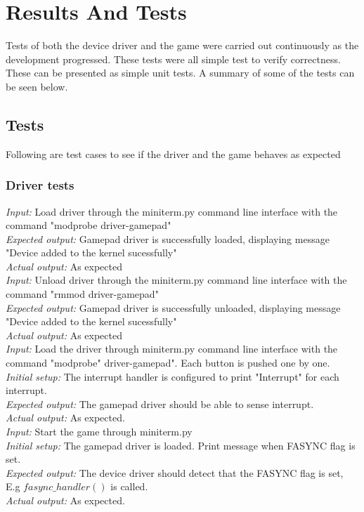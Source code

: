 \section{Results And Tests}
Tests of both the device driver and the game were carried out continuously as the development progressed. These tests were all simple test to verify correctness. These can be presented as simple unit tests. A summary of some of the tests can be seen below.  

\subsection{Tests}

Following are test cases to see if the driver and the game behaves as expected

\subsubsection{Driver tests}

\emph{Input: } Load driver through the miniterm.py command line interface with the command "modprobe driver-gamepad"\\
\emph{Expected output: } Gamepad driver is successfully loaded, displaying message "Device added to the kernel sucessfully"\\
\emph{Actual output: } As expected\\

\emph{Input: } Unload driver through the miniterm.py command line interface with the command "rmmod driver-gamepad"\\
\emph{Expected output: } Gamepad driver is successfully unloaded, displaying message "Device added to the kernel sucessfully"\\
\emph{Actual output: } As expected\\

\emph{Input: } Load the driver through miniterm.py command line interface with the command "modprobe" driver-gamepad". Each button is pushed one by one.\\
\emph{Initial setup: } The interrupt handler is configured to print "Interrupt" for each interrupt.\\
\emph{Expected output: } The gamepad driver should be able to sense interrupt.\\
\emph{Actual output: } As expected. \\ 

\emph{Input: } Start the game through miniterm.py  \\
\emph{Initial setup: } The gamepad driver is loaded. Print message when FASYNC flag is set.\\
\emph{Expected output: } The device driver should detect that the FASYNC flag is set, E.g $fasync\_handler()$ is called.\\ 
\emph{Actual output: } As expected. \\




